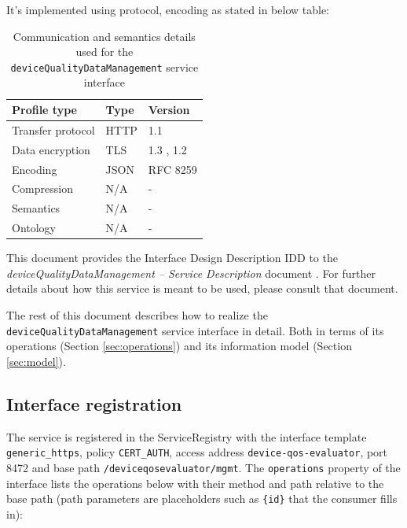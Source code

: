 \documentclass[a4paper]{arrowhead}
\begin{document}
It's implemented using protocol, encoding as stated in below table:
\begin{table}[ht!]
  \centering
  \begin{tabular}{|l|l|l|}
    \hline
    \rowcolor{gray!33} Profile type & Type & Version \\ \hline
    Transfer protocol & HTTP & 1.1 \cite{rfc9112} \\ \hline
    Data encryption & TLS & 1.3 \cite{rfc8446}, 1.2 \cite{rfc5246} \\ \hline
    Encoding & JSON & RFC 8259 \cite{rfc8259} \\ \hline
    Compression & N/A & - \\ \hline
    Semantics & N/A & - \\ \hline
    Ontology & N/A & - \\ \hline
  \end{tabular}
  \caption{Communication and semantics details used for the \texttt{device\allowbreak{}Quality\allowbreak{}Data\allowbreak{}Management} service interface}
  \label{tab:comunication_semantics_profile}
\end{table}

This document provides the Interface Design Description IDD to the \textit{deviceQualityDataManagement -- Service Description} document \cite{dqe-deviceQualityDataManagement-sd}.
For further details about how this service is meant to be used, please consult that document.

The rest of this document describes how to realize the \texttt{device\allowbreak{}Quality\allowbreak{}Data\allowbreak{}Management} service
interface in detail. Both in terms of its operations (Section \ref{sec:operations}) and its information model (Section \ref{sec:model}).

\subsection{Interface registration}

The service is registered in the ServiceRegistry with the interface template \texttt{generic\_\allowbreak{}https}, policy \texttt{CERT\_\allowbreak{}AUTH}, access address \texttt{device-\allowbreak{}qos-\allowbreak{}evaluator}, port 8472 and base path \texttt{/\allowbreak{}deviceqosevaluator/\allowbreak{}mgmt}. The \texttt{operations} property of the interface lists the operations below with their method and path relative to the base path (path parameters are placeholders such as \texttt{\{id\}} that the consumer fills in):
\end{document}
